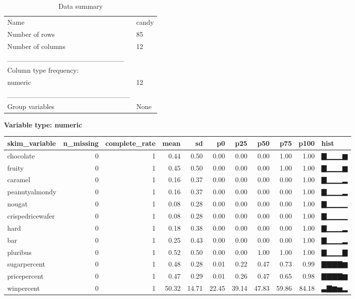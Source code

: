 \documentclass[
]{article}
\begin{document}
\begin{longtable}[]{@{}ll@{}}
\caption{Data summary}\tabularnewline
\toprule
\endhead
Name & candy \\
Number of rows & 85 \\
Number of columns & 12 \\
\_\_\_\_\_\_\_\_\_\_\_\_\_\_\_\_\_\_\_\_\_\_\_ & \\
Column type frequency: & \\
numeric & 12 \\
\_\_\_\_\_\_\_\_\_\_\_\_\_\_\_\_\_\_\_\_\_\_\_\_ & \\
Group variables & None \\
\bottomrule
\end{longtable}

\textbf{Variable type: numeric}

\begin{longtable}[]{@{}lrrrrrrrrrl@{}}
\toprule
skim\_variable & n\_missing & complete\_rate & mean & sd & p0 & p25 &
p50 & p75 & p100 & hist \\
\midrule
\endhead
chocolate & 0 & 1 & 0.44 & 0.50 & 0.00 & 0.00 & 0.00 & 1.00 & 1.00 &
▇▁▁▁▆ \\
fruity & 0 & 1 & 0.45 & 0.50 & 0.00 & 0.00 & 0.00 & 1.00 & 1.00 &
▇▁▁▁▆ \\
caramel & 0 & 1 & 0.16 & 0.37 & 0.00 & 0.00 & 0.00 & 0.00 & 1.00 &
▇▁▁▁▂ \\
peanutyalmondy & 0 & 1 & 0.16 & 0.37 & 0.00 & 0.00 & 0.00 & 0.00 & 1.00
& ▇▁▁▁▂ \\
nougat & 0 & 1 & 0.08 & 0.28 & 0.00 & 0.00 & 0.00 & 0.00 & 1.00 &
▇▁▁▁▁ \\
crispedricewafer & 0 & 1 & 0.08 & 0.28 & 0.00 & 0.00 & 0.00 & 0.00 &
1.00 & ▇▁▁▁▁ \\
hard & 0 & 1 & 0.18 & 0.38 & 0.00 & 0.00 & 0.00 & 0.00 & 1.00 & ▇▁▁▁▂ \\
bar & 0 & 1 & 0.25 & 0.43 & 0.00 & 0.00 & 0.00 & 0.00 & 1.00 & ▇▁▁▁▂ \\
pluribus & 0 & 1 & 0.52 & 0.50 & 0.00 & 0.00 & 1.00 & 1.00 & 1.00 &
▇▁▁▁▇ \\
sugarpercent & 0 & 1 & 0.48 & 0.28 & 0.01 & 0.22 & 0.47 & 0.73 & 0.99 &
▇▇▇▇▆ \\
pricepercent & 0 & 1 & 0.47 & 0.29 & 0.01 & 0.26 & 0.47 & 0.65 & 0.98 &
▇▇▇▇▆ \\
winpercent & 0 & 1 & 50.32 & 14.71 & 22.45 & 39.14 & 47.83 & 59.86 &
84.18 & ▃▇▆▅▂ \\
\bottomrule
\end{longtable}
\end{document}
